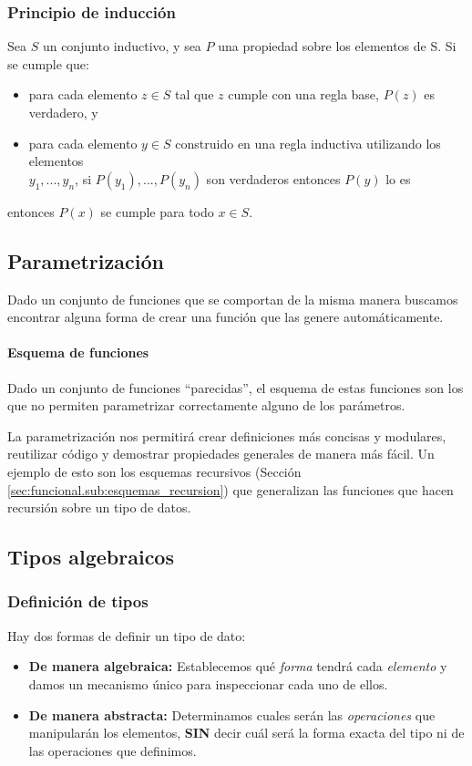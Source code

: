 \subsubsection{Principio de inducción}
Sea $S$ un conjunto inductivo, y sea $P$ una propiedad sobre los elementos de S. Si se cumple que:
\begin{itemize}
	\item para cada elemento $z\in S$ tal que $z$ cumple con una regla base, $P(z)$ es verdadero, y
	\item para cada elemento $y\in S$ construido en una regla inductiva utilizando los elementos \\ $y_1, ..., y_n$, si $P(y_1 ), ..., P(y_n)$ son verdaderos entonces $P(y)$ lo es
	
\end{itemize}

entonces $P(x)$ se cumple para todo $x\in S$.

\subsection{Parametrización}
Dado un conjunto de funciones que se comportan de la misma manera buscamos encontrar alguna forma de crear una función que las genere automáticamente. 

\paragraph{Esquema de funciones} Dado un conjunto de funciones ``parecidas'', el esquema de estas funciones son los que no permiten parametrizar correctamente alguno de los parámetros.

La parametrización nos permitirá crear definiciones más concisas y modulares, reutilizar código y demostrar propiedades generales de manera más fácil. Un ejemplo de esto son los esquemas recursivos (Sección \ref{sec:funcional.sub:esquemas_recursion}) que generalizan las funciones que hacen recursión sobre un tipo de datos.

\subsection{Tipos algebraicos}

\subsubsection{Definición de tipos}
Hay dos formas de definir un tipo de dato:
\begin{itemize}
	\item \textbf{De manera algebraica:} Establecemos qué \textit{forma} tendrá cada \textit{elemento} y damos un mecanismo único para inspeccionar cada uno de ellos.
	\item \textbf{De manera abstracta:} Determinamos cuales serán las \textit{operaciones} que manipularán los elementos, \textbf{SIN} decir cuál será la forma exacta del tipo ni de las operaciones que definimos.
\end{itemize}

